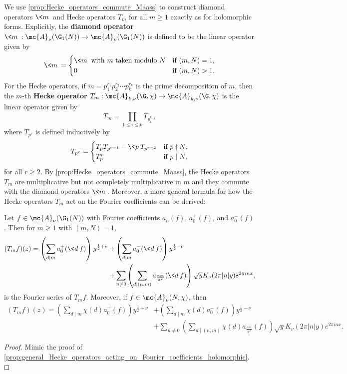     We use \cref{prop:Hecke_operators_commute_Maass} to construct diamond operators $\<m\>$ and Hecke operators $T_{m}$ for all $m \ge 1$ exactly as for holomorphic forms. Explicitly, the \textbf{diamond operator} $\<m\>:\mc{A}_{\nu}(\G_{1}(N)) \to \mc{A}_{\nu}(\G_{1}(N))$ is defined to be the linear operator given by
    \[
      \<m\> = \begin{cases} \<m\> \text{ with $m$ taken modulo $N$} & \text{if $(m,N) = 1$,} \\ 0 & \text{if $(m,N) > 1$.} \end{cases}
    \]
    For the Hecke operators, if $m = p_{1}^{r_{1}}p_{2}^{r_{2}} \cdots p_{k}^{r_{k}}$ is the prime decomposition of $m$, then the $m$-th \textbf{Hecke operator} $T_{m}:\mc{A}_{k,\nu}(\G,\chi) \to \mc{A}_{k,\nu}(\G,\chi)$ is the linear operator given by
    \[
      T_{m} = \prod_{1 \le i \le k}T_{p_{i}^{r_{i}}},
    \]
    where $T_{p^{r}}$ is defined inductively by
    \[
      T_{p^{r}} = \begin{cases} T_{p}T_{p^{r-1}}-\<p\>T_{p^{r-2}} & \text{if $p \nmid N$}, \\ T_{p}^{r} & \text{if $p \mid N$}, \end{cases}
    \]
    for all $r \ge 2$. By \cref{prop:Hecke_operators_commute_Maass}, the Hecke operators $T_{m}$ are multiplicative but not completely multiplicative in $m$ and they commute with the diamond operators $\<m\>$. Moreover, a more general formula for how the Hecke operators $T_{m}$ act on the Fourier coefficients can be derived:

    \begin{proposition}\label{prop:general_Hecke_operators_acting_on_Fourier_coefficients_Maass}
      Let $f \in \mc{A}_{\nu}(\G_{1}(N))$ with Fourier coefficients $a_{n}(f)$, $a_{0}^{+}(f)$, and $a_{0}^{-}(f)$. Then for $m \ge 1$ with $(m,N) = 1$,
      \begin{align*}
        (T_{m}f)(z) = \left(\sum_{d \mid m}a_{0}^{+}(\<d\>f)\right)y^{\frac{1}{2}+\nu}&+\left(\sum_{d \mid m}a_{0}^{-}(\<d\>f)\right)y^{\frac{1}{2}-\nu} \\
        &+ \sum_{n \neq 0}\left(\sum_{d \mid (n,m)}a_{\frac{nm}{d^{2}}}(\<d\>f)\right)\sqrt{y}K_{\nu}(2\pi|n|y)e^{2\pi inx},
      \end{align*}
      is the Fourier series of $T_{m}f$. Moreover, if $f \in \mc{A}_{\nu}(N,\chi)$, then
      \begin{align*}
        (T_{m}f)(z) = \left(\sum_{d \mid m}\chi(d)a_{0}^{+}(f)\right)y^{\frac{1}{2}+\nu}&+\left(\sum_{d \mid m}\chi(d)a_{0}^{-}(f)\right)y^{\frac{1}{2}-\nu} \\
        &+ \sum_{n \neq 0}\left(\sum_{d \mid (n,m)}\chi(d)a_{\frac{nm}{d^{2}}}(f)\right)\sqrt{y}K_{\nu}(2\pi|n|y)e^{2\pi inx}.
      \end{align*}
    \end{proposition}
    \begin{proof}
      Mimic the proof of \cref{prop:general_Hecke_operators_acting_on_Fourier_coefficients_holomorphic}.
    \end{proof}

